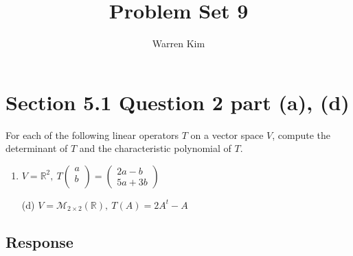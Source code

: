 \documentclass[13pt]{article}
\title{Problem Set 9}
\author{Warren Kim}
\begin{document}
\maketitle

\newpage
\section*{Section 5.1 Question 2 part (a), (d)}
For each of the following linear operators $T$ on a vector space $V$, compute the determinant of $T$ and the characteristic polynomial of $T$.

\begin{enumerate}[label=(\alph*),leftmargin=*]
\item $V = \mathbb{R}^2, \ T
  \begin{pmatrix}
    a \\
    b \\
  \end{pmatrix} =
  \begin{pmatrix}
    2a - b \\
    5a + 3b
  \end{pmatrix}$

\item [(d)] $V = \mathcal{M}_{2 \times 2}(\mathbb{R}), \ T(A) = 2A^t - A$
\end{enumerate}

\subsection*{Response}
\end{document}
